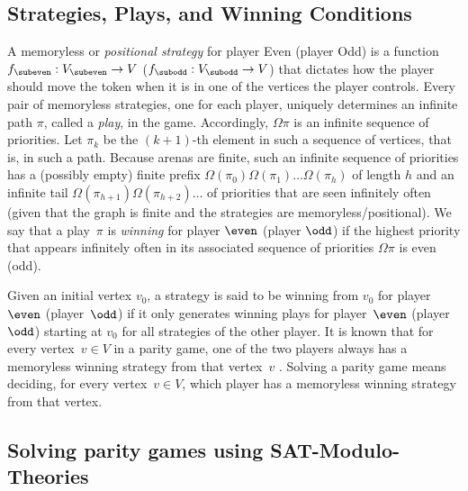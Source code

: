 \documentclass[runningheads]{llncs}
\begin{document}
\subsection*{Strategies, Plays, and Winning Conditions}
A memoryless or {\em positional strategy} for player Even (player Odd) is a function $f_{\subeven} : V_{\subeven} \to V$ ($f_{\subodd} : V_{\subodd} \to V$) that dictates how the player should move the token when it is in one of the vertices the player controls. Every pair of memoryless strategies, one for each player, uniquely determines an infinite path $\pi$, called a {\em play}, in the game. Accordingly, $\Omega \pi$ is an infinite sequence of priorities. Let $\pi_k$ be the $(k+1)$-th element in such a sequence of vertices, that is, in such a path. Because arenas are finite, such an infinite sequence of priorities has a (possibly empty) finite prefix $\Omega(\pi_0) \Omega(\pi_1) \ldots \Omega(\pi_h)$ of length $h$ and an infinite tail $\Omega(\pi_{h+1}) \Omega(\pi_{h+2}) \ldots$ of priorities that are seen infinitely often (given that the graph is finite and the strategies are memoryless/positional). We say that a play~$\pi$ is {\em winning} for player $\even$ (player $\odd$) if the highest priority that appears infinitely often in its associated sequence of priorities $\Omega \pi$ is even (odd). 

Given an initial vertex $v_0$, a strategy is said to be winning from $v_0$ for player~$\even$ (player~$\odd$) if it only generates winning plays for player~$\even$ (player~$\odd$) starting at $v_0$ for all strategies of the other player. It is known that for every vertex~$v\in V$ in a parity game, one of the two players always has a memoryless winning strategy from that vertex~$v$ \cite{Zielonka:1998}. Solving a parity game means deciding, for every vertex~$v\in V$, which player has a memoryless winning strategy from that vertex.

\subsection{Solving parity games using SAT-Modulo-Theories}
\end{document}
